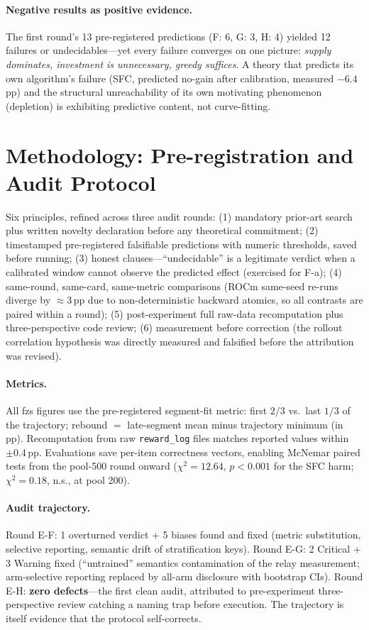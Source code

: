 \documentclass[11pt]{article}
\theoremstyle{definition}
\begin{document}
\paragraph{Negative results as positive evidence.} The first round's 13
pre-registered predictions (F: 6, G: 3, H: 4) yielded 12 failures or
undecidables---yet every failure converges on one picture: \emph{supply dominates,
investment is unnecessary, greedy suffices}. A theory that predicts its own
algorithm's failure (SFC, predicted no-gain after calibration, measured
$-6.4$\,pp) and the structural unreachability of its own motivating phenomenon
(depletion) is exhibiting predictive content, not curve-fitting.

\section{Methodology: Pre-registration and Audit Protocol}\label{sec:method}
Six principles, refined across three audit rounds: (1) mandatory prior-art search
plus written novelty declaration before any theoretical commitment; (2)
timestamped pre-registered falsifiable predictions with numeric thresholds, saved
before running; (3) honest clauses---``undecidable'' is a legitimate verdict when
a calibrated window cannot observe the predicted effect (exercised for F-a);
(4) same-round, same-card, same-metric comparisons (ROCm same-seed re-runs diverge
by ${\approx}3$\,pp due to non-deterministic backward atomics, so all contrasts are
paired within a round); (5) post-experiment full raw-data recomputation plus
three-perspective code review; (6) measurement before correction (the rollout
correlation hypothesis was directly measured and falsified before the attribution
was revised).

\paragraph{Metrics.} All fzs figures use the pre-registered segment-fit metric:
first $2/3$ vs.\ last $1/3$ of the trajectory; rebound $=$ late-segment mean minus
trajectory minimum (in pp). Recomputation from raw \texttt{reward\_log} files
matches reported values within $\pm0.4$\,pp. Evaluations save per-item correctness
vectors, enabling McNemar paired tests from the pool-500 round onward
($\chi^2{=}12.64$, $p{<}0.001$ for the SFC harm; $\chi^2{=}0.18$, n.s., at pool
200).

\paragraph{Audit trajectory.} Round E-F: 1 overturned verdict + 5 biases found and
fixed (metric substitution, selective reporting, semantic drift of stratification
keys). Round E-G: 2 Critical + 3 Warning fixed (``untrained'' semantics
contamination of the relay measurement; arm-selective reporting replaced by
all-arm disclosure with bootstrap CIs). Round E-H: \textbf{zero defects}---the
first clean audit, attributed to pre-experiment three-perspective review catching
a naming trap before execution. The trajectory is itself evidence that the
protocol self-corrects.
\end{document}
